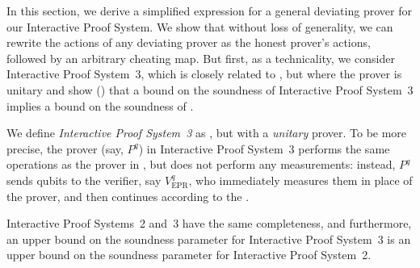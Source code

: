\documentclass{toc}
\begin{document}
In this section, we derive a simplified expression for a general deviating prover for our Interactive Proof System. %
%
%
We  
show  that without loss of generality, we can
%
rewrite  %
the actions of any deviating prover as the honest prover's actions, followed by an arbitrary cheating map. But first, as a technicality, we consider Interactive Proof System~3, which is closely related to , but  where the prover is unitary and show () that a bound on the soundness of  Interactive Proof System~3 implies a bound on the soundness of .

\begin{definition}
  We define \emph{Interactive Proof System~3} as , but with a \emph{unitary} prover. To be more precise, the prover (say, $P^q$) in Interactive Proof System~3 performs the same operations as the prover in , but does not perform any measurements:  instead, $P^q$ sends qubits to the verifier, say  $V^{q}_{\text{EPR}}$, who immediately measures them in place of the prover, and then continues according to the .
\end{definition}


\begin{lemma} \label{lem:purified-EPR-protocol}
Interactive Proof Systems~2 and~3 have the same completeness, and furthermore, an upper bound on the soundness parameter for Interactive Proof System~3 is an upper bound on the soundness parameter for Interactive Proof System~2.
\end{lemma}
\end{document}

